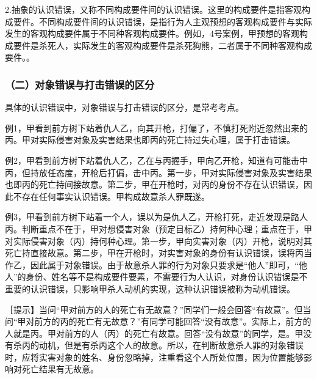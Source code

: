 2.抽象的认识错误，又称不同构成要件间的认识错误。这里的构成要件是指客观构成要件。不同构成要件间的认识错误，是指行为人主观预想的客观构成要件与实际发生的客观构成要件属于不同种客观构成要件。例如，4号案例，甲预想的客观构成要件是杀死人，实际发生的客观构成要件是杀死狗熊，二者属于不同种客观构成要件。。

\subsubsection*{（二）对象错误与打击错误的区分}

具体的认识错误中，对象错误与打击错误的区分，是常考考点。



例1，甲看到前方树下站着仇人乙，向其开枪，打偏了，不慎打死附近忽然出来的丙。甲对实际侵害对象及实害结果也即丙的死亡持过失心理，属于打击错误。

例2，甲看到前方树下站着仇人乙，乙在与丙握手，甲向乙开枪，知道有可能击中丙，但持放任态度，开枪后打偏，击中丙。第一步，甲对实际侵害对象及实害结果也即丙的死亡持间接故意。第二步，甲在开枪时，对丙的身份不存在认识错误，因此不存在任何事实认识错误。甲构成故意杀人罪既遂。

例3，甲看到前方树下站着一个人，误以为是仇人乙，开枪打死，走近发现是路人丙。判断重点不在于，甲对想侵害对象（预定目标乙）持何种心理；重点在于，甲对实际侵害对象（丙）持何种心理。第一步，甲向实害对象（丙）开枪，说明对其死亡持直接故意。第二步，甲在开枪时，对实害对象的身份有认识错误，误将丙当作乙，因此属于对象错误。由于故意杀人罪的行为对象只要求是“他人”即可，“他人”的身份、姓名等不是构成要件要素，不需要行为人认识，对身份认识错误是不重要的认识错误，只影响甲杀人动机的实现，这种认识错误被称为动机错误。

［提示】当问“甲对前方的人的死亡有无故意？”同学们一般会回答“有故意”。但当问“甲对前方的丙的死亡有无故意？”有同学可能回答“没有故意”。实际上，前方的人就是丙。甲对前方的人（丙）的死亡有故意。回答“没有故意”的同学，是。甲没有杀丙的动机，但是有杀丙这个人的故意。所以，在判断故意杀人罪的对象错误时，应将实害对象的姓名、身份忽略掉，注重看这个人所处位置，因为位置能够影响对死亡结果有无故意。


